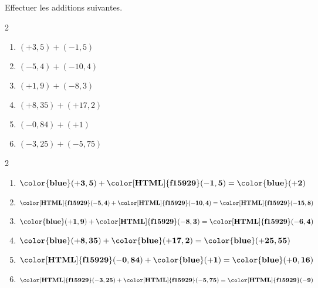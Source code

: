 \begin{exercice*}
    Effectuer les additions suivantes.
    \begin{multicols}2
        \begin{enumerate}            
                \item $ (+3,5) + (-1,5)$
                \item $ (-5,4) + (-10,4)$
                \item $ (+1,9) + (-8,3)$
                \item $ (+8,35) + (+17,2)$
                \item $ (-0,84) + (+1)$
                \item $ (-3,25) + (-5,75)$
        \end{enumerate}
    \end{multicols}    
\end{exercice*}
\begin{corrige}
    \phantom{rrr}    
    \begin{multicols}2
        \begin{enumerate}
            \item $ \mathbf{{\color{blue}(+3,5)}} + \mathbf{{\color[HTML]{f15929}(-1,5)}} = \mathbf{{\color{blue}(+2)}} $
            \item $ \mathbf{{\color[HTML]{f15929}(-5,4)}} + \mathbf{{\color[HTML]{f15929}(-10,4)}} = \mathbf{{\color[HTML]{f15929}(-15,8)}} $
            \item $ \mathbf{{\color{blue}(+1,9)}} + \mathbf{{\color[HTML]{f15929}(-8,3)}} = \mathbf{{\color[HTML]{f15929}(-6,4)}} $
            \item $ \mathbf{{\color{blue}(+8,35)}} + \mathbf{{\color{blue}(+17,2)}} = \mathbf{{\color{blue}(+25,55)}} $
            \item $ \mathbf{{\color[HTML]{f15929}(-0,84)}} + \mathbf{{\color{blue}(+1)}} = \mathbf{{\color{blue}(+0,16)}} $
            \item $ \mathbf{{\color[HTML]{f15929}(-3,25)}} + \mathbf{{\color[HTML]{f15929}(-5,75)}} = \mathbf{{\color[HTML]{f15929}(-9)}} $
        \end{enumerate}   
    \end{multicols}
\end{corrige}

